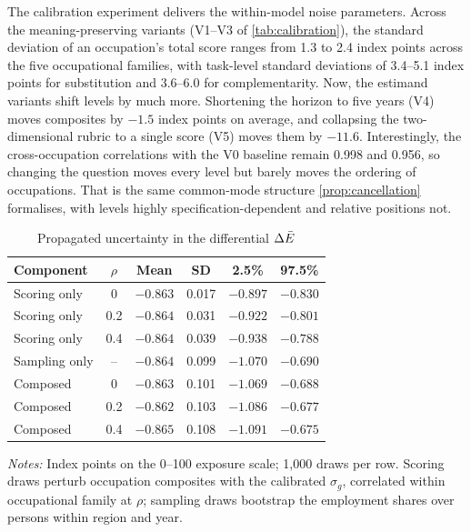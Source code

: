 The calibration experiment delivers the within-model noise parameters. Across the meaning-preserving variants (V1--V3 of \cref{tab:calibration}), the standard deviation of an occupation's total score ranges from 1.3 to 2.4 index points across the five occupational families, with task-level standard deviations of 3.4--5.1 index points for substitution and 3.6--6.0 for complementarity. Now, the estimand variants shift levels by much more. Shortening the horizon to five years (V4) moves composites by $-1.5$ index points on average, and collapsing the two-dimensional rubric to a single score (V5) moves them by $-11.6$. Interestingly, the cross-occupation correlations with the V0 baseline remain 0.998 and 0.956, so changing the question moves every level but barely moves the ordering of occupations. That is the same common-mode structure \cref{prop:cancellation} formalises, with levels highly specification-dependent and relative positions not. 
 
\begin{table}[t]
\centering
\caption{Propagated uncertainty in the differential $\protect\Delta\bar{E}$}
\label{tab:propagation}
\small
\begin{tabular}{lccccc}
\toprule
Component & $\rho$ & Mean & SD & 2.5\% & 97.5\% \\
\midrule
Scoring only  & 0   & $-0.863$ & 0.017 & $-0.897$ & $-0.830$ \\
Scoring only  & 0.2 & $-0.864$ & 0.031 & $-0.922$ & $-0.801$ \\
Scoring only  & 0.4 & $-0.864$ & 0.039 & $-0.938$ & $-0.788$ \\
Sampling only & --  & $-0.864$ & 0.099 & $-1.070$ & $-0.690$ \\
Composed      & 0   & $-0.863$ & 0.101 & $-1.069$ & $-0.688$ \\
Composed      & 0.2 & $-0.862$ & 0.103 & $-1.086$ & $-0.677$ \\
Composed      & 0.4 & $-0.865$ & 0.108 & $-1.091$ & $-0.675$ \\
\bottomrule
\end{tabular}
\begin{minipage}{0.92\textwidth}
\vspace{0.4em}\footnotesize
\textit{Notes:} Index points on the 0--100 exposure scale; 1,000 draws per row. Scoring draws perturb occupation composites with the calibrated $\sigma_g$, correlated within occupational family at $\rho$; sampling draws bootstrap the employment shares over persons within region and year.
\end{minipage}
\end{table}
 
